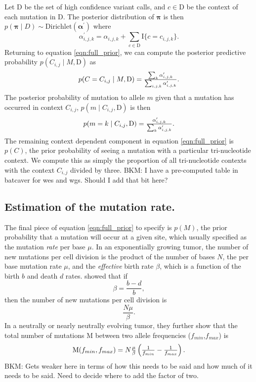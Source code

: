 \documentclass[a4,center,fleqn]{NAR}
\newcommand{\bkmcomment}[1]{{\color{blue}BKM: #1}}
\begin{document}
Let $\mathrm{D}$ be the set of high confidence variant calls, and $c \in \mathrm{D}$ be the context of each mutation in $\mathrm{D}$.
The posterior distribution of $\boldsymbol{\pi}$ is then $p(\boldsymbol{\pi} \mid D) \sim \textrm{Dirichlet}(\boldsymbol{\alpha^{\prime}})$ where
  $$
    \alpha^{\prime}_{i,j,k} = \alpha_{i,j,k} + \sum\limits_{c \in \mathrm{D}} \mathrm{I}\{c = c_{i,j,k}\}.
  $$
Returning to equation \ref{eqn:full_prior}, we can compute the posterior predictive probability $p(C_{i,j} \mid M,\mathrm{D})$ as
\begin{equation}
  \label{eqn:post_pred}
  $$
  p(C = C_{i,j} \mid M,\mathrm{D}) = \frac{\sum_{k}\alpha^{\prime}_{i,j,k}}{\sum_{i,j,k}\alpha^{\prime}_{i,j,k}}.
  $$
\end{equation}
The posterior probability of mutation to allele $m$ given that a mutation has occurred in context $C_{i,j}$, $p(m \mid C_{i,j},\mathrm{D})$ is then
\begin{equation}
  \label{eqn:to_allele}
  $$
   p(m = k \mid C_{i,j},\mathrm{D}) = \frac{\alpha^{\prime}_{i,j,k}}{\sum_{k} \alpha^{\prime}_{i,j,k}}.
  $$
\end{equation}
The remaining context dependent component in equation \ref{eqn:full_prior} is $p(C)$, the prior probability of seeing a mutation with a particular tri-nucleotide context.
We compute this as simply the proportion of all tri-nucleotide contexts with the context $C_{i,j}$ divided by three. \bkmcomment{I have a pre-computed table in batcaver for wes and wgs. Should I add that bit here?}

\subsection{Estimation of the mutation rate.}
The final piece of equation \ref{eqn:full_prior} to specify is $p(M)$, the prior probability that a mutation will occur at a given site, which usually specified as the mutation \textit{rate} per base $\mu$.
In an exponentially growing tumor, the number of new mutations per cell division is the product of the number of bases $N$, the per base mutation rate $\mu$, and the \textit{effective} birth rate $\beta$, which is a function of the birth $b$ and death $d$ rates.
\citet{Williams2016} showed that if 
$$
  \beta = \frac{b-d}{b},
$$
then the number of new mutations per cell division is
$$
  \frac{N \mu}{\beta}.
$$
In a neutrally or nearly neutrally evolving tumor, they further show that the total number of mutations $\mathrm{M}$ between two allele frequencies ($f_{min}$,$f_{max}$) is
\begin{equation}
  \label{eqn:mut_rate}
$$
  \mathrm{M}(f_{min},f_{max}) = N\frac{\mu}{\beta}\left(\frac{1}{f_{min}} - \frac{1}{f_{max}}\right).
$$
\end{equation}
\bkmcomment{Gets weaker here in terms of how this needs to be said and how much of it needs to be said. Need to decide where to add the factor of two.}
\end{document}
